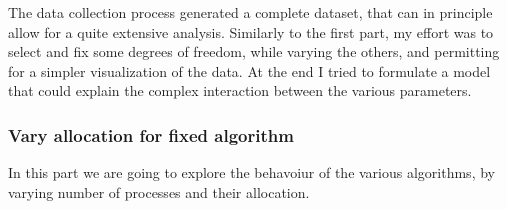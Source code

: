 \documentclass{article}
\begin{document}
	The data collection process generated a complete dataset, that can in principle allow for a quite extensive analysis. Similarly to the first part, my effort was to select and fix some degrees of freedom, while varying the others, and permitting for a simpler visualization of the data.
	At the end I tried to formulate a model that could explain the complex interaction between the various parameters.
	
	\subsubsection{Vary allocation for fixed algorithm}
	
	In this part we are going to explore the behavoiur of the various algorithms, by varying number of processes and their allocation.
	
	
\end{document}
